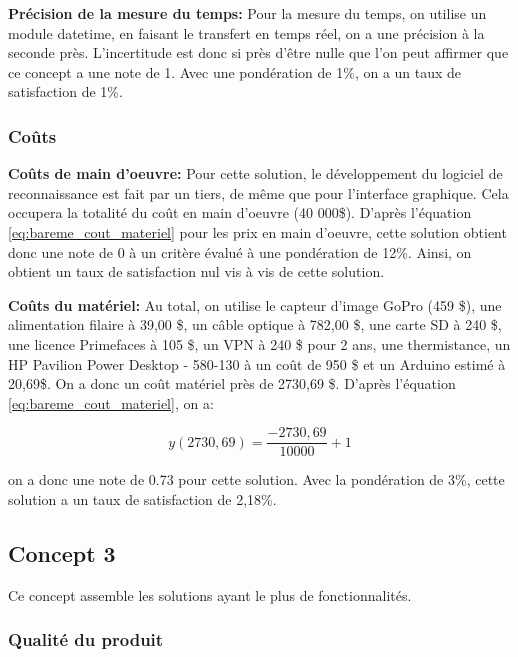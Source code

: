 \textbf{Précision de la mesure du temps:}
Pour la mesure du temps, on utilise un module datetime, en faisant le transfert en temps réel, on a une précision à la seconde près. L'incertitude est donc si près d'être nulle que l'on peut affirmer que ce concept a une note de 1. Avec une pondération de 1\%, on a un taux de satisfaction de 1\%. 
\vspace{5mm}



\subsubsection{Coûts}

\textbf{Coûts de main d'oeuvre:}
Pour cette solution, le développement du logiciel de reconnaissance est fait par un tiers, de même que pour l'interface graphique. Cela occupera la totalité du coût en main d'oeuvre (40 000\$). D'après l'équation \ref{eq:bareme_cout_materiel} pour les prix en main d'oeuvre, cette solution obtient donc une note de 0 à un critère évalué à une pondération de 12\%. Ainsi, on obtient un taux de satisfaction nul vis à vis de cette solution.
\vspace{5mm}

\textbf{Coûts du matériel:}
Au total, on utilise le capteur d'image GoPro (459 \$), une alimentation filaire à 39,00 \$, un câble optique à 782,00 \$, une carte SD à 240 \$, une licence Primefaces à 105 \$, un VPN à 240 \$ pour 2 ans, une thermistance, un HP Pavilion Power Desktop - 580-130 à un coût de 950 \$ et un Arduino estimé à 20,69\$. On a donc un coût matériel près de 2730,69 \$. D'après l'équation \ref{eq:bareme_cout_materiel}, on a:

\begin{equation}
y(2730,69) =  \frac{-2730,69}{10000} +1 \end{equation}

on a donc une note de 0.73 pour cette solution. Avec la pondération de 3\%, cette solution a un taux de satisfaction de 2,18\%.




\subsection{Concept 3}

Ce concept assemble les solutions ayant le plus de fonctionnalités.

\subsubsection{Qualité du produit}

